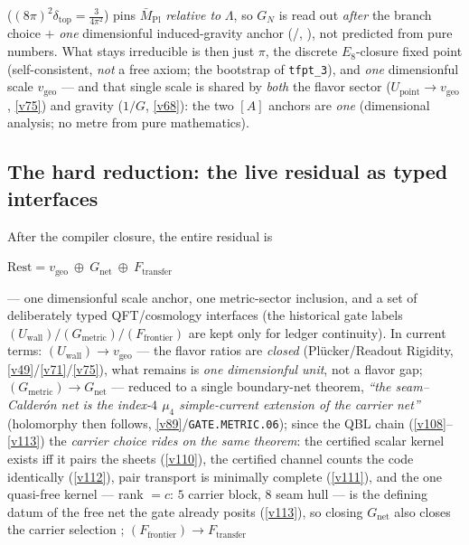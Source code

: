 \documentclass[11pt,a4paper]{article}
\begin{document}
($(8\pi)^2\delta_{\mathrm{top}}=\tfrac{3}{4\pi^2}$) pins $\bar M_{\mathrm{Pl}}$ \emph{relative to} $\Lambda$, so
$G_N$ is read out \emph{after} the branch choice $+$ \emph{one} dimensionful induced-gravity anchor (\mE/\mC,
), not predicted from pure numbers. What stays irreducible is then
just $\pi$, the discrete $E_8$-closure fixed point (self-consistent, \emph{not} a free axiom; the bootstrap of
\texttt{tfpt\_3}), and \emph{one} dimensionful scale $v_{\mathrm{geo}}$ --- and that single scale is shared by
\emph{both} the flavor sector ($U_{\mathrm{point}}\to v_{\mathrm{geo}}$, \vref{v75}) and gravity ($1/G$, \vref{v68}): the two
$[A]$ anchors are \emph{one} (dimensional analysis; no metre from pure mathematics).

\subsection*{The hard reduction: the live residual as typed interfaces}
\noindent After the compiler closure, the entire residual is
\begin{keyeq}
$\displaystyle \text{Rest}=v_{\mathrm{geo}}\ \oplus\ G_{\mathrm{net}}\ \oplus\ F_{\mathrm{transfer}}$
\end{keyeq}
--- one dimensionful scale anchor, one metric-sector inclusion, and a set of deliberately typed
QFT/cosmology interfaces (the historical gate labels $(U_{\mathrm{wall}})/(G_{\mathrm{metric}})/(F_{\mathrm{frontier}})$ are
kept only for ledger continuity). In current terms: $(U_{\mathrm{wall}})\to v_{\mathrm{geo}}$ --- the flavor ratios are
\emph{closed} (Pl\"ucker/Readout Rigidity, \vref{v49}/\vref{v71}/\vref{v75}), what remains is \emph{one dimensionful unit}, not a
flavor gap; $(G_{\mathrm{metric}})\to G_{\mathrm{net}}$ --- reduced to a single boundary-net theorem,
\emph{``the seam--Calder\'on net is the index-$4$ $\mu_4$ simple-current extension of the carrier net''}
(holomorphy then follows, \vref{v89}/\texttt{GATE.METRIC.06}); since the QBL chain
(\vref{v108}--\vref{v113}) the \emph{carrier choice rides on the same theorem}: the certified scalar kernel exists
iff it pairs the sheets (\vref{v110}), the certified channel counts the code identically (\vref{v112}), pair
transport is minimally complete (\vref{v111}), and the one quasi-free kernel --- rank $=c$: $5$ carrier
block, $8$ seam hull --- is the defining datum of the free net the gate already posits (\vref{v113}), so
closing $G_{\mathrm{net}}$ also closes the carrier selection \mE; $(F_{\mathrm{frontier}})\to F_{\mathrm{transfer}}$
\end{document}
